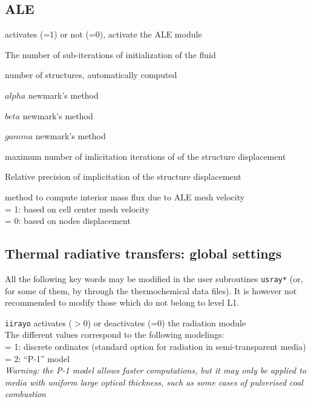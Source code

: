 \subsection{ALE}
{activates (=1) or not (=0), activate the ALE module}

{The number of sub-iterations of initialization of the fluid}

{number of structures, automatically computed}

{$alpha$ newmark's method}

{$beta$ newmark's method}

{$gamma$ newmark's method}

{maximum number of imlicitation iterations of of the structure displacement}

{Relative precision of implicitation of the structure displacement }

{method to compute interior mass flux due to ALE mesh velocity\\
\hspace*{1.3cm} = 1: based on cell center mesh velocity\\
\hspace*{1.3cm} = 0: based on nodes displacement
}
\subsection{Thermal radiative transfers: global settings}

All the following key words may be modified in the user subroutines
\texttt{usray*} (or, for some of them, by through the thermochemical data files).
It is however not recommended to modify those which do not belong to
level L1.

{{\tt iirayo} activates ($>0$) or deactivates
(=0) the radiation module\\
The different values correspond to the following modelings:\\
\hspace*{1.3cm} = 1: discrete ordinates
(standard option for radiation in semi-transparent media)\\
\hspace*{1.3cm} = 2: ``P-1'' model\\
{\em Warning: the P-1 model allows faster computations, but it
may only be applied to media with uniform large optical thickness, such as
some cases of pulverised coal combustion}}

